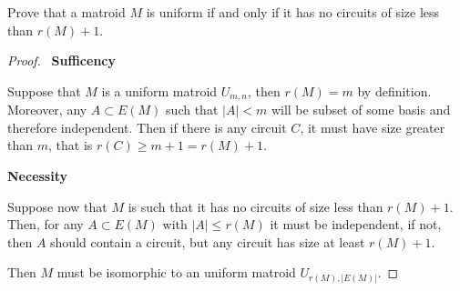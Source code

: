 \prob
{\label{t1:p6}
    Prove that a matroid $M$ is uniform if and only if it has no circuits of 
    size less than $r(M) + 1$.
}
\begin{proof}
    $\,$\pn
    \textbf{Sufficency}\pn

	Suppose that $M$ is a uniform matroid $U_{m, n}$, then $r(M) = m$ by definition.
    Moreover, any $A \subset E(M)$ such that $|A| < m$ will be subset of some basis and
    therefore independent. Then if there is any circuit $C$, it must have size greater
    than $m$, that is $r(C) \geq m + 1 = r(M) + 1$.\pn

    \textbf{Necessity}\pn
    
    Suppose now that $M$ is such that it has no circuits of size less than $r(M) + 1$.
    Then, for any $A \subset E(M)$ with $|A| \leq r(M)$ it must be independent, if not,
    then $A$ should contain a circuit, but any circuit has size at least $r(M) + 1$.\pn
    
    Then $M$ must be isomorphic to an uniform matroid $U_{r(M), |E(M)|}$.
\end{proof}